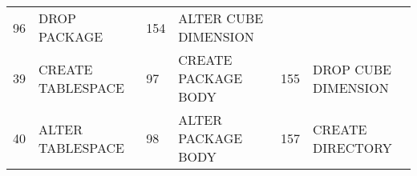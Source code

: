 \begin{longtable}[]{@{}llllll@{}}
\begin{minipage}[t]{0.06\columnwidth}
96\strut
\end{minipage} & \begin{minipage}[t]{0.24\columnwidth}\raggedright\strut
DROP PACKAGE\strut
\end{minipage} & \begin{minipage}[t]{0.06\columnwidth}\raggedright\strut
154\strut
\end{minipage} & \begin{minipage}[t]{0.24\columnwidth}\raggedright\strut
ALTER CUBE DIMENSION\strut
\end{minipage}\tabularnewline
\begin{minipage}[t]{0.06\columnwidth}\raggedright\strut
39\strut
\end{minipage} & \begin{minipage}[t]{0.19\columnwidth}\raggedright\strut
CREATE TABLESPACE\strut
\end{minipage} & \begin{minipage}[t]{0.06\columnwidth}\raggedright\strut
97\strut
\end{minipage} & \begin{minipage}[t]{0.24\columnwidth}\raggedright\strut
CREATE PACKAGE BODY\strut
\end{minipage} & \begin{minipage}[t]{0.06\columnwidth}\raggedright\strut
155\strut
\end{minipage} & \begin{minipage}[t]{0.24\columnwidth}\raggedright\strut
DROP CUBE DIMENSION\strut
\end{minipage}\tabularnewline
\begin{minipage}[t]{0.06\columnwidth}\raggedright\strut
40\strut
\end{minipage} & \begin{minipage}[t]{0.19\columnwidth}\raggedright\strut
ALTER TABLESPACE\strut
\end{minipage} & \begin{minipage}[t]{0.06\columnwidth}\raggedright\strut
98\strut
\end{minipage} & \begin{minipage}[t]{0.24\columnwidth}\raggedright\strut
ALTER PACKAGE BODY\strut
\end{minipage} & \begin{minipage}[t]{0.06\columnwidth}\raggedright\strut
157\strut
\end{minipage} & \begin{minipage}[t]{0.24\columnwidth}\raggedright\strut
CREATE DIRECTORY\strut
\end{minipage}\tabularnewline

\end{longtable}
